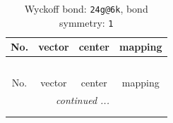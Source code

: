 \documentclass[fleqn,8pt]{jsarticle}
\begin{document}
\renewcommand{\arraystretch}{1.2}
\begin{longtable}{cccc}
\caption{Wyckoff bond: {\tt 24g@6k}, bond symmetry: {\tt 1}}
 \\
 \hline \hline
No. & vector & center & mapping \\ \hline \endfirsthead

\multicolumn{3}{l}{\tablename\ \thetable{}} \\
 \hline \hline
No. & vector & center & mapping \\ \hline \endhead

 \hline \hline
\multicolumn{3}{r}{\footnotesize\it continued ...} \\ \endfoot

 \hline \hline
\multicolumn{3}{r}{} \\ \endlastfoot


\end{longtable}
\end{document}
